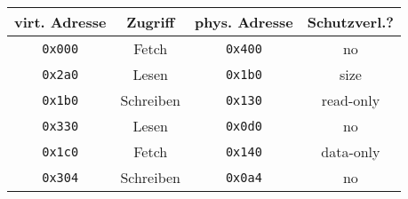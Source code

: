 

\usepackage{wasysym}

\date{Donnerstag 09.07.2020}


    \maketitle
    \thispagestyle{fancy}

    \begin{center}
        \begin{tabular}{|c|c||c|c|}
            \hline 
            virt. Adresse & Zugriff & phys. Adresse & Schutzverl.? \\ \hline
            \texttt{0x000} & Fetch     & \texttt{0x400} & no \\
            \texttt{0x2a0} & Lesen     & \texttt{0x1b0} & size \\
            \texttt{0x1b0} & Schreiben & \texttt{0x130} & read-only \\
            \texttt{0x330} & Lesen     & \texttt{0x0d0} & no \\
            \texttt{0x1c0} & Fetch     & \texttt{0x140} & data-only \\
            \texttt{0x304} & Schreiben & \texttt{0x0a4} & no \\ \hline
        \end{tabular}
    \end{center}

    




% 
% 

